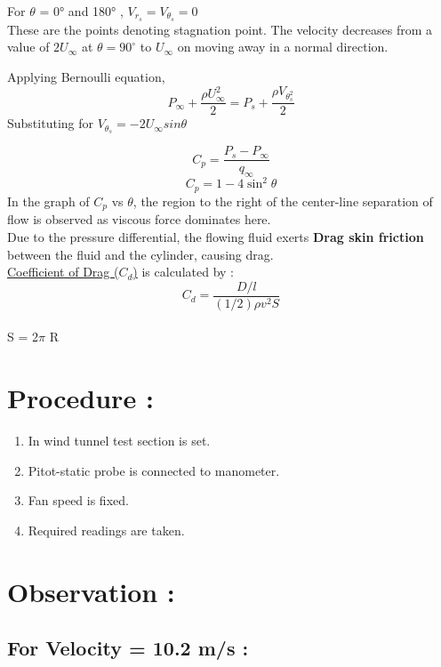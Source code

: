 \documentclass[12pt,a4paper]{article}
\begin{document}
For $\theta $ = 0° and 180° , $V_r_s = V_{\theta}_s = 0 $ \\
These are the points denoting stagnation point. The velocity decreases from a value of $2U_{\infty}$ at $\theta = 90 ^{\circ}$ to $U_{\infty}$ on moving away in a normal direction.

Applying Bernoulli equation, \\
$$ P_{\infty} + \frac{\rho U_{\infty}^{2}}{2} = P_s +  \frac{\rho V_{\theta}_s^{2}}{2} $$ 
Substituting for $V_{\theta}_s = -2U_{\infty} sin{\theta}$

$$ C_p = \frac{P_s - P_{\infty}}{q_{\infty}} $$
$$C_p = 1- 4 {\sin^2{\theta}} $$
In the graph of $C_p$ vs $\theta$, the region to the right of the center-line separation of flow is observed as viscous force dominates here.\\



Due to the pressure differential, the flowing fluid exerts \textbf{Drag skin friction} between the fluid and the cylinder, causing drag. \\
\underline{Coefficient of Drag ($C_d$)} is calculated by :
$$ C_d = \frac{D/l}{(1/2)\rho v^2 S} $$ \\
S = 2$\pi$ R \\




   




\section{Procedure :}
\begin{enumerate}
    \item In wind tunnel test section is set.
    \item Pitot-static probe is connected to manometer.
    \item Fan speed is fixed.
    \item Required readings are taken.
\end{enumerate}






\section{Observation :}



\subsection{For Velocity = 10.2 m/s : } 
\end{document}
